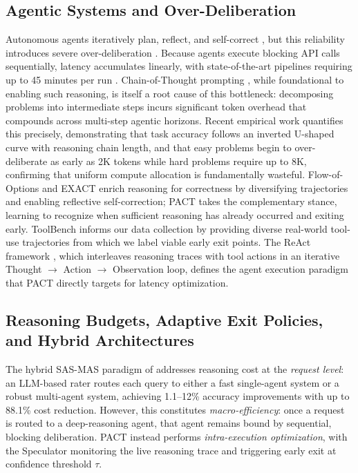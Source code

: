 \documentclass[letterpaper,twocolumn,10pt]{article}
\begin{document}
\subsection{Agentic Systems and Over-Deliberation}
Autonomous agents iteratively plan, reflect, and self-correct 
\cite{nair2025flow, yu2024exact}, but this reliability introduces severe 
over-deliberation \cite{masterman2025ai}. Because agents execute blocking API calls 
sequentially, latency accumulates linearly, with state-of-the-art pipelines requiring 
up to 45 minutes per run \cite{mialon2023gaia}. Chain-of-Thought prompting 
\cite{wei2022chain}, while foundational to enabling such reasoning, is itself a root 
cause of this bottleneck: decomposing problems into intermediate steps incurs 
significant token overhead that compounds across multi-step agentic horizons. Recent 
empirical work \cite{overthinking2025} quantifies this precisely, demonstrating that 
task accuracy follows an inverted U-shaped curve with reasoning chain length, and that 
easy problems begin to over-deliberate as early as 2K tokens while hard problems require 
up to 8K, confirming that uniform compute allocation is fundamentally wasteful. 
Flow-of-Options \cite{nair2025flow} and EXACT \cite{yu2024exact} enrich reasoning for 
correctness by diversifying trajectories and enabling reflective self-correction; PACT 
takes the complementary stance, learning to recognize when sufficient reasoning has 
already occurred and exiting early. ToolBench \cite{qin2023toolbench} informs our data 
collection by providing diverse real-world tool-use trajectories from which we label 
viable early exit points. The ReAct framework \cite{yao2022react}, which interleaves 
reasoning traces with tool actions in an iterative Thought $\rightarrow$ Action 
$\rightarrow$ Observation loop, defines the agent execution paradigm that PACT directly 
targets for latency optimization.

\subsection{Reasoning Budgets, Adaptive Exit Policies, and Hybrid Architectures}
The hybrid SAS-MAS paradigm of \cite{gao2025single} addresses reasoning cost at the 
\textit{request level}: an LLM-based rater routes each query to either a fast 
single-agent system or a robust multi-agent system, achieving 1.1--12\% accuracy 
improvements with up to 88.1\% cost reduction. However, this constitutes 
\textit{macro-efficiency}: once a request is routed to a deep-reasoning agent, that 
agent remains bound by sequential, blocking deliberation. PACT instead performs 
\textit{intra-execution optimization}, with the Speculator monitoring the live reasoning 
trace and triggering early exit at confidence threshold $\tau$.
\end{document}
